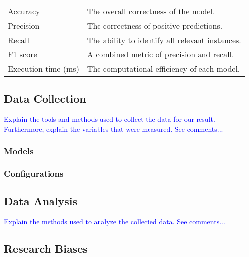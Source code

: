 \begin{center}
    \begin{tabular}{| l | l |}
        Accuracy            & The overall correctness of the model.           \\
        Precision           & The correctness of positive predictions.        \\
        Recall              & The ability to identify all relevant instances. \\
        F1 score            & A combined metric of precision and recall.      \\
        Execution time (ms) & The computational efficiency of each model.     \\
    \end{tabular}
\end{center}

\subsection{Data Collection}
%
%
\textcolor{blue}{Explain the tools and methods used to collect the data for our
result. Furthermore, explain the variables that were measured. See comments...}

\subsubsection{Models}
%

\subsubsection{Configurations}
%

\subsection{Data Analysis}
%
%
\textcolor{blue}{Explain the methods used to analyze the collected data. See comments...}

\subsection{Research Biases}
%
